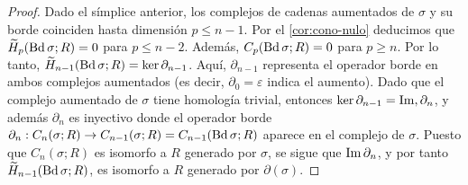 \begin{proof}
	Dado el símplice anterior, los complejos de cadenas aumentados de $\sigma$ y
	su borde coinciden hasta dimensión $p \leq n-1$. Por el \autoref{cor:cono-nulo}
	deducimos que $\widetilde{H}_{p}(\operatorname{Bd} \sigma; R) = 0$ para $p \leq n-2$. Además,
	$C_{p}(\operatorname{Bd} \sigma; R) = 0$ para $p \geq n$. Por lo tanto, $\widetilde{H}_{n-1}(
	\operatorname{Bd}\sigma;R)=\ker \partial_{n-1}$. Aquí, $\partial_{n-1}$ representa el operador
	borde en ambos complejos aumentados (es decir, $\partial_{0}=\varepsilon$ indica
	el aumento). Dado que el complejo aumentado de $\sigma$ tiene homología trivial,
	entonces $\ker \partial_{n-1}=\operatorname{Im}, \partial_{n}$, y además $\partial_{n}$ es inyectivo
	donde el operador borde $\partial_{n}: C_{n}(\sigma; R) \rightarrow C_{n-1}(\sigma
	; R) = C_{n-1}(\operatorname{Bd} \sigma; R)$ aparece en el complejo de $\sigma$. Puesto que
	$C_{n}(\sigma;R)$ es isomorfo a $R$ generado por $\sigma$, se sigue que $\operatorname{Im} \partial
	_{n}$, y por tanto $\widetilde{H}_{n-1}(\operatorname{Bd}\sigma;R)$, es isomorfo a $R$ generado
	por $\partial(\sigma)$.
\end{proof}

